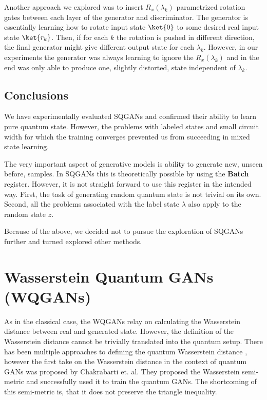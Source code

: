 Another approach we explored was to insert $R_x(\lambda_k)$ parametrized
rotation gates between each layer of the generator and discriminator. The
generator is essentially learning how to rotate input state $\ket{0}$ to some
desired real input state $\ket{r_k}$. Then, if for each $k$ the rotation is
pushed in different direction, the final generator might give different output
state for each $\lambda_k$. However, in our experiments the generator was always
learning to ignore the $R_x(\lambda_k)$ and in the end was only able to produce
one, slightly distorted, state independent of $\lambda_k$.

\subsection{Conclusions}
We have experimentally evaluated SQGANs and confirmed their ability to learn
pure quantum state. However, the problems with labeled states and small
circuit width for which the training converges prevented us from succeeding in
mixed state learning.

The very important aspect of generative models is ability to generate new,
unseen before, samples. In SQGANs this is theoretically possible by using the
\textbf{Batch} register. However, it is not straight forward to use this register
in the intended way. First, the task of generating random quantum state is not
trivial on its own. Second, all the problems associated with the label state
$\lambda$ also apply to the random state $z$. 

Because of the above, we decided not to pursue the exploration of SQGANs further
and turned explored other methods.


\section{Wasserstein Quantum GANs (WQGANs)}

As in the classical case, the WQGANs relay on calculating the Wasserstein
distance between real and generated state. However, the definition of the
Wasserstein distance cannot be trivially translated into the quantum setup.
There has been multiple approaches to defining the quantum Wasserstein distance
\cite{carlen2012analog,chen2016matrix,chen2018Wasserstein,ning2013matrixvalued,peyré2017quantum,golse2021quantum,Golse_2016,yu2019quantum},
however the first take on the Wasserstein distance in the context of quantum
GANs was proposed by Chakrabarti et. al\cite{chakrabarti2019quantum}. They
proposed the Wasserstein semi-metric and successfully used it to train the
quantum GANs. The shortcoming of this semi-metric is, that it does not preserve the
triangle inequality.


